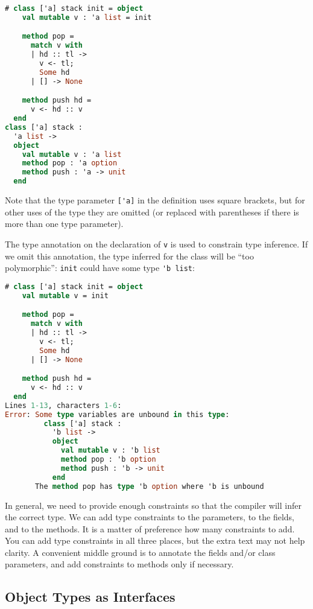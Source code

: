\begin{lstlisting}[language=Caml]
# class ['a] stack init = object
    val mutable v : 'a list = init

    method pop =
      match v with
      | hd :: tl ->
        v <- tl;
        Some hd
      | [] -> None

    method push hd =
      v <- hd :: v
  end
class ['a] stack :
  'a list ->
  object
    val mutable v : 'a list
    method pop : 'a option
    method push : 'a -> unit
  end
\end{lstlisting}

Note that the type parameter \passthrough{\lstinline!['a]!} in the
definition uses square brackets, but for other uses of the type they are
omitted (or replaced with parentheses if there is more than one type
parameter).

The type annotation on the declaration of \passthrough{\lstinline!v!} is
used to constrain type inference. If we omit this annotation, the type
inferred for the class will be ``too polymorphic'':
\passthrough{\lstinline!init!} could have some type
\passthrough{\lstinline!'b list!}:

\begin{lstlisting}[language=Caml]
# class ['a] stack init = object
    val mutable v = init

    method pop =
      match v with
      | hd :: tl ->
        v <- tl;
        Some hd
      | [] -> None

    method push hd =
      v <- hd :: v
  end
Lines 1-13, characters 1-6:
Error: Some type variables are unbound in this type:
         class ['a] stack :
           'b list ->
           object
             val mutable v : 'b list
             method pop : 'b option
             method push : 'b -> unit
           end
       The method pop has type 'b option where 'b is unbound
\end{lstlisting}

In general, we need to provide enough constraints so that the compiler
will infer the correct type. We can add type constraints to the
parameters, to the fields, and to the methods. It is a matter of
preference how many constraints to add. You can add type constraints in
all three places, but the extra text may not help clarity. A convenient
middle ground is to annotate the fields and/or class parameters, and add
constraints to methods only if necessary.

\hypertarget{object-types-as-interfaces}{%
\subsection{Object Types as
Interfaces}\label{object-types-as-interfaces}}

